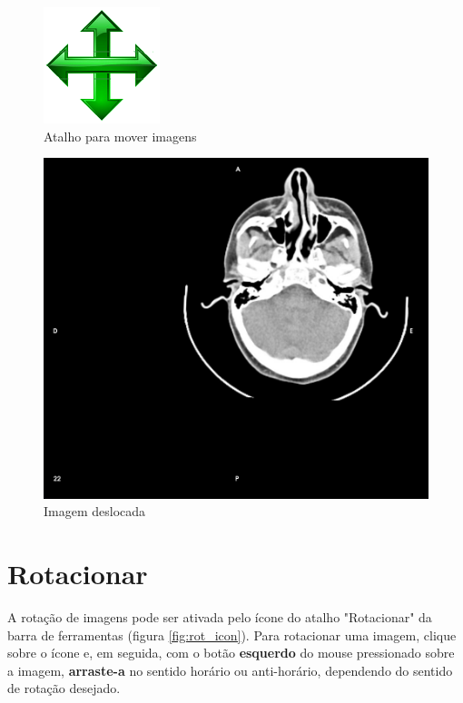 \begin{figure}[!h]
\centering
\includegraphics[scale=0.25]{../user_guide_figures/icons/tool_translate_original.png}
\caption{Atalho para mover imagens}
\label{fig:move_icon}
\end{figure}

\begin{figure}[!h]
\centering
\includegraphics[scale=0.15]{../user_guide_figures/invesalius_screen/axial_pan.jpg}
\caption{Imagem deslocada}
\label{fig:move_img}
\end{figure}

\section{Rotacionar}

A rotação de imagens pode ser ativada pelo ícone do atalho "Rotacionar" da barra de ferramentas (figura
\ref{fig:rot_icon}). Para rotacionar uma imagem, clique sobre o ícone e, em seguida, com o botão
\textbf{esquerdo} do mouse pressionado sobre a imagem, \textbf{arraste-a} no sentido horário ou
anti-horário, dependendo do sentido de rotação desejado.

